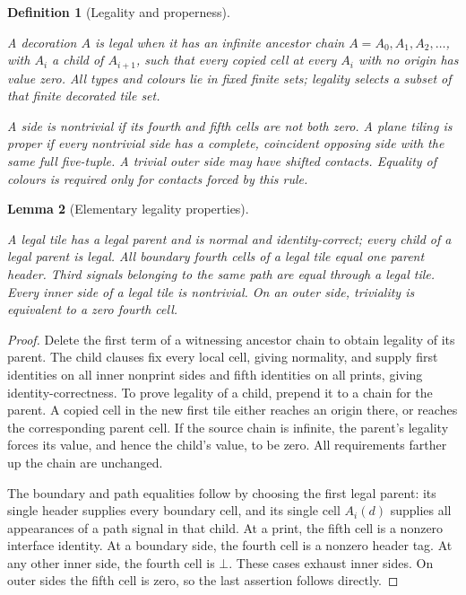 \documentclass[11pt,a4paper]{article}
\newtheorem{definition}{Definition}[section]
\newtheorem{lemma}[definition]{Lemma}
\theoremstyle{remark}
\newcommand{\lean}[1]{}
\newcommand{\uses}[1]{}
\begin{document}
\begin{definition}[Legality and properness]
\label{def:control/legal}
\lean{Tilings.Planned.headerLegal}
\uses{def:control/origin,def:control/substitution,def:tiling}
A decoration $A$ is legal when it has an infinite ancestor chain
$A=A_0,A_1,A_2,\ldots$, with $A_i$ a child of $A_{i+1}$, such that every
copied cell at every $A_i$ with no origin has value zero. All types and
colours lie in fixed finite sets; legality selects a subset of that finite
decorated tile set.

A side is nontrivial if its fourth and fifth cells are not both zero.
A plane tiling is proper if every nontrivial side has a complete, coincident
opposing side with the same full five-tuple. A trivial outer side may have
shifted contacts. Equality of colours is required only for contacts forced
by this rule.
\end{definition}

\begin{lemma}[Elementary legality properties]
\label{lem:comp/legal-properties}
\lean{Tilings.Planned.headerLegal_properties,Tilings.Planned.Strict.strictLegal_properties}
\uses{def:control/legal,def:control/typed-decoration,def:control/substitution}
A legal tile has a legal parent and is normal and identity-correct;
every child of a legal parent
is legal. All boundary fourth cells of a legal tile equal one parent header.
Third signals belonging to the same path are equal through a legal tile.
Every inner side of a legal tile is nontrivial. On an outer side, triviality
is equivalent to a zero fourth cell.
\end{lemma}
\begin{proof}
Delete the first term of a witnessing ancestor chain to obtain legality of
its parent. The child clauses fix every local cell, giving normality, and
supply first identities on all inner nonprint sides and fifth identities
on all prints, giving identity-correctness.
To prove legality of a child, prepend it to a chain for the parent. A copied
cell in the new first tile either reaches an origin there, or reaches the
corresponding parent cell. If the source chain is infinite, the parent's
legality forces its value, and hence the child's value, to be zero. All
requirements farther up the chain are unchanged.

The boundary and path equalities follow by choosing the first legal parent:
its single header supplies every boundary cell, and its single cell $A_i(d)$
supplies all appearances of a path signal in that child. At a print, the
fifth cell is a nonzero interface identity. At a boundary side, the fourth cell
is a nonzero header tag. At any other inner side, the fourth cell is $\bot$.
These cases exhaust inner sides. On outer sides the fifth cell is zero,
so the last assertion follows directly.
\end{proof}
\end{document}
